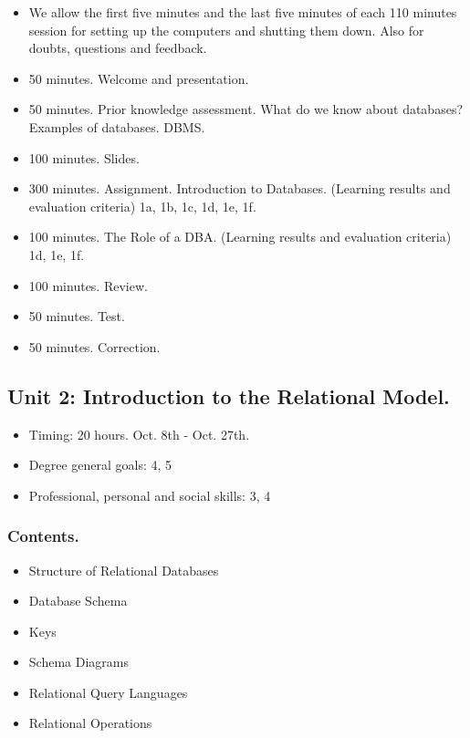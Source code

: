 \documentclass[catalan, a4paper, 12pt, titlepage]{article}
\begin{document}
  \begin{itemize}
          \item We allow the first five minutes and the last five minutes of each 110 minutes session for setting up the computers and shutting them down. Also for doubts, questions and feedback.
	  \item 50 minutes. Welcome and presentation.
	  \item 50 minutes. Prior knowledge assessment. What do we know about databases? Examples of databases. DBMS.
	  \item 100 minutes. Slides.
	  \item 300 minutes. Assignment. Introduction to Databases.
		  (\faGraduationCap Learning results and evaluation criteria) 1a, 1b, 1c, 1d, 1e, 1f.
	  \item 100 minutes. The Role of a DBA.
		  (\faGraduationCap Learning results and evaluation criteria) 1d, 1e, 1f.
	  \item 100 minutes. Review.
	  \item 50 minutes. Test.
	  \item 50 minutes. Correction.
  \end{itemize}

  \subsection{Unit 2: Introduction to the Relational Model.}

  \begin{itemize}
	\item Timing: 20 hours. Oct. 8th - Oct. 27th.
	\item Degree general goals: 4, 5
	\item Professional, personal and social skills: 3, 4
  \end{itemize}

  \subsubsection{Contents.}

  \begin{itemize}
	  \item Structure of Relational Databases
	  \item Database Schema
	  \item Keys
	  \item Schema Diagrams
	  \item Relational Query Languages
	  \item Relational Operations
  \end{itemize}
\end{document}
